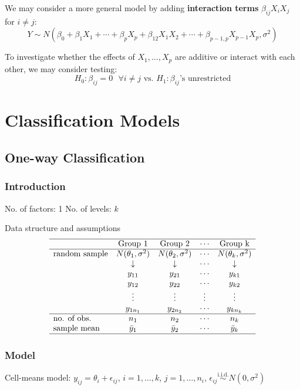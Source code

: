 \documentclass[11pt,a4paper]{article}
\begin{document}
We may consider a more general model by adding \textbf{interaction terms} $\beta_{ij} X_i X_j$ for $i \neq j$:
\[
Y \sim N(\beta_0 + \beta_1 X_1 + \cdots + \beta_p X_p + \beta_{12} X_1 X_2 + \cdots + \beta_{p-1, p} X_{p-1} X_p, \sigma^2)
\]

To investigate whether the effects of $X_1, \dots, X_p$ are additive or interact with each other, we may consider testing:
\[
H_0: \beta_{ij} = 0 \text{ } \forall i \neq j \text{ vs. } H_1: \beta_{ij} \text{'s unrestricted}
\]

\section{Classification Models}
\subsection{One-way Classification}
\subsubsection{Introduction}
No. of factors: 1     No. of levels: $k$ \par

Data structure and assumptions
\[
\begin{array}{lcccc}
    \hline
    & \text{Group 1} & \text{Group 2} & \cdots & \text{Group k} \\
    \hline
    \text{random sample} & N(\theta_1, \sigma^2) & N(\theta_2, \sigma^2) & \cdots & N(\theta_k, \sigma^2) \\
    & \downarrow & \downarrow & \cdots & \downarrow \\
    & y_{11} & y_{21} & \cdots & y_{k1} \\
    & y_{12} & y_{22} & \cdots & y_{k2} \\
    & \vdots & \vdots & \vdots & \vdots \\
    & y_{1n_1} & y_{2n_2} & \cdots & y_{kn_k} \\
    \hline
    \text{no. of obs.} & n_1 & n_2 & \cdots & n_k \\
    \text{sample mean} & \bar{y}_1 & \bar{y}_2 & \cdots & \bar{y}_k \\
    \hline
\end{array}
\]

\subsubsection{Model}
Cell-means model: $y_{ij} = \theta_i + \epsilon_{ij}$, $i = 1, \dots, k$, $j = 1, \dots, n_i$, $\epsilon_{ij} \overset{\text{i.i.d.}}{\sim} N(0, \sigma^2)$ \par
\end{document}
